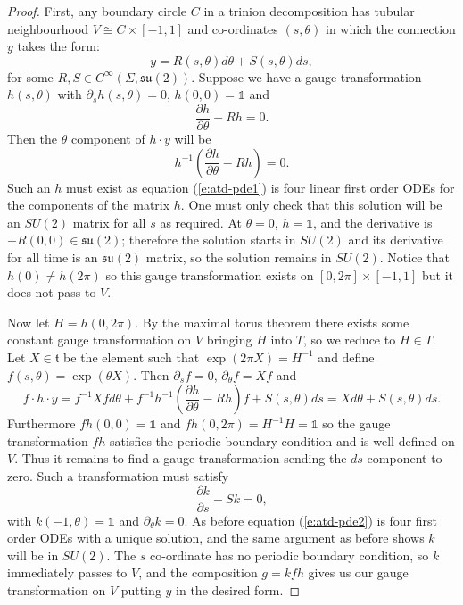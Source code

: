 	\begin{proof}
	First, any boundary circle $C$ in a trinion decomposition has tubular neighbourhood $V\cong C\times [-1,1]$ and co-ordinates $(s,\theta)$ in which the connection $y$ takes the form:
	\begin{equation}
		y = R(s,\theta)d\theta + S(s,\theta)ds,
	\end{equation}
	for some $R,S \in C^\infty(\Sigma, \mathfrak{su}(2))$. Suppose we have a gauge transformation $h(s,\theta)$ with $\partial_s h(s,\theta)=0$, $h(0,0)=\mathds{1}$ and
	\begin{equation}
		\label{e:atd-pde1}
		\frac{\partial h}{\partial \theta} - Rh = 0.
	\end{equation}
	Then the $\theta$ component of $h\cdot y$ will be 
	\begin{equation}
		h^{-1}\left(\frac{\partial h}{\partial \theta} - Rh\right) = 0.
	\end{equation}
	Such an $h$ must exist as equation (\ref{e:atd-pde1}) is four linear first order ODEs for the components of the matrix $h$. One must only check that this solution will be an $SU(2)$ matrix for all $s$ as required. At $\theta=0$, $h = \mathds{1}$, and the derivative is $-R(0,0) \in \mathfrak{su}(2)$; therefore the solution starts in $SU(2)$ and its derivative for all time is an $\mathfrak{su}(2)$ matrix, so the solution remains in $SU(2)$. Notice that $h(0) \neq h(2\pi)$ so this gauge transformation exists on $[0,2\pi]\times[-1,1]$ but it does not pass to $V$.
	
	Now let $H=h(0,2\pi)$. By the maximal torus theorem there exists some constant gauge transformation on $V$ bringing $H$ into $T$, so we reduce to $H\in T$. Let $X \in \mathfrak{t}$ be the element such that $\exp(2\pi X) = H^{-1}$ and define $f(s,\theta) = \exp(\theta X)$. Then $\partial_s f = 0$, $\partial_\theta f = Xf$ and 
	\begin{equation}
		f\cdot h \cdot y = f^{-1}Xfd\theta + f^{-1}h^{-1}\left(\frac{\partial h}{\partial \theta} - Rh\right)f + S(s,\theta)ds = Xd\theta + S(s,\theta)ds.
	\end{equation}
	Furthermore $fh(0,0) = \mathds{1}$ and $fh(0,2\pi) = H^{-1}H = \mathds{1}$ so the gauge transformation $fh$ satisfies the periodic boundary condition and is well defined on $V$. Thus it remains to find a gauge transformation sending the $ds$ component to zero. Such a transformation must satisfy 
	\begin{equation}
		\label{e:atd-pde2}
		\frac{\partial k}{\partial s} - Sk = 0,
	\end{equation} 
	with $k(-1,\theta) = \mathds{1}$ and $\partial_\theta k = 0$. As before equation (\ref{e:atd-pde2}) is four first order ODEs with a unique solution, and the same argument as before shows $k$ will be in $SU(2)$. The $s$ co-ordinate has no periodic boundary condition, so $k$ immediately passes to $V$, and the composition $g = kfh$ gives us our gauge transformation on $V$ putting $y$ in the desired form.
	

\end{proof}
